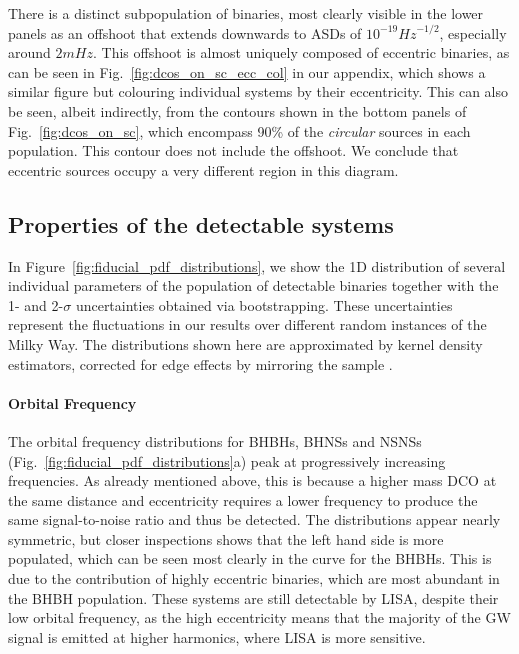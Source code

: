 There is a distinct subpopulation of binaries, most clearly visible in the lower panels as an offshoot that extends downwards to ASDs of $10^{-19} \unit{Hz}^{-1/2}$, especially around $2 \unit{mHz}$. This offshoot is almost uniquely composed of eccentric binaries, as can be seen in Fig.~\ref{fig:dcos_on_sc_ecc_col} in our appendix, which shows a similar figure but colouring individual systems by their eccentricity. This can also be seen, albeit indirectly, from the contours shown in the bottom panels of Fig.~\ref{fig:dcos_on_sc}, which encompass 90\% of the \textit{circular} sources in each population. This contour does not include the offshoot. We conclude that eccentric sources occupy a very different region in this diagram.

\subsection{Properties of the detectable systems}\label{sec:fiducial_distributions}
In Figure~\ref{fig:fiducial_pdf_distributions}, we show the 1D distribution of several individual parameters of the population of detectable binaries together with the 1- and 2-$\sigma$ uncertainties obtained via bootstrapping. These uncertainties represent the fluctuations in our results over different random instances of the Milky Way. The distributions shown here are approximated by kernel density estimators, corrected for edge effects by mirroring the sample \citep{Schuster+1985}.

\paragraph{Orbital Frequency} The orbital frequency distributions for BHBHs, BHNSs and NSNSs (Fig.~\ref{fig:fiducial_pdf_distributions}a) peak at progressively increasing frequencies. As already mentioned above, this is because a higher mass DCO at the same distance and eccentricity requires a lower frequency to produce the same signal-to-noise ratio and thus be detected. The distributions appear nearly symmetric, but closer inspections shows that the left hand side is more populated, which can be seen most clearly in the curve for the BHBHs. This is due to the contribution of highly eccentric binaries, which are most abundant in the BHBH population. These systems are still detectable by LISA, despite their low orbital frequency, as the high eccentricity means that the majority of the GW signal is emitted at higher harmonics, where LISA is more sensitive.

